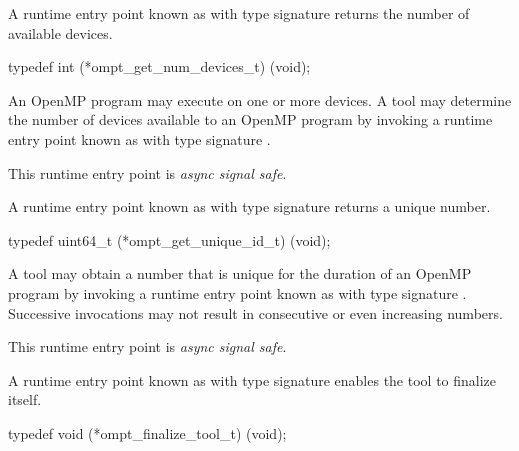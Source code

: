 \summary
A runtime entry point known as 
with type signature 
returns the number of available devices.

\format
\begin{ccppspecific}
\begin{omptInquiry}
typedef int (*ompt_get_num_devices_t) (void);
\end{omptInquiry}
\end{ccppspecific}

\descr

An OpenMP program may execute on one or more devices.
A tool may determine the number of devices available to an OpenMP
program by invoking a runtime entry point
known as 
with type signature .

This runtime entry point is \emph{async signal safe}.



\label{sec:ompt_get_unique_id_t}
\label{sec:ompt_get_unique_id}

\summary
A runtime entry point known as 
with type signature 
returns a unique number.

\format
\begin{ccppspecific}
\begin{omptInquiry}
typedef uint64_t (*ompt_get_unique_id_t) (void);
\end{omptInquiry}
\end{ccppspecific}

\descr

A tool may obtain a number that is unique for the duration of an
OpenMP program by invoking a runtime entry point
known as 
with type signature .
Successive invocations may not result in
consecutive or even increasing numbers.

This runtime entry point is \emph{async signal safe}.


\label{sec:ompt_finalize_tool_t}
\label{sec:ompt_finalize_tool}

\summary
A runtime entry point known as 
with type signature 
enables the tool to finalize itself.

\format
\begin{ccppspecific}
\begin{omptInquiry}
typedef void (*ompt_finalize_tool_t) (void);
\end{omptInquiry}
\end{ccppspecific}

